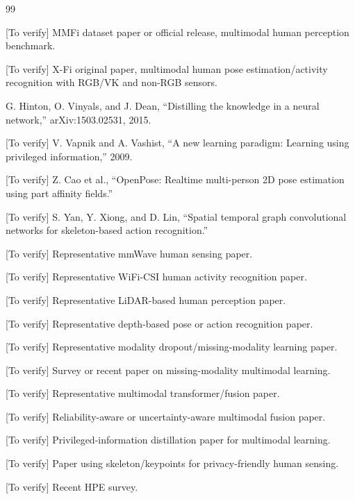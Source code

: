 \documentclass[journal]{IEEEtran}
\begin{document}
\begin{thebibliography}{99}

[To verify] MMFi dataset paper or official release, multimodal human perception benchmark.

[To verify] X-Fi original paper, multimodal human pose estimation/activity recognition with RGB/VK and non-RGB sensors.

G. Hinton, O. Vinyals, and J. Dean, ``Distilling the knowledge in a neural network,'' arXiv:1503.02531, 2015.

[To verify] V. Vapnik and A. Vashist, ``A new learning paradigm: Learning using privileged information,'' 2009.

[To verify] Z. Cao et al., ``OpenPose: Realtime multi-person 2D pose estimation using part affinity fields.''

[To verify] S. Yan, Y. Xiong, and D. Lin, ``Spatial temporal graph convolutional networks for skeleton-based action recognition.''

[To verify] Representative mmWave human sensing paper.

[To verify] Representative WiFi-CSI human activity recognition paper.

[To verify] Representative LiDAR-based human perception paper.

[To verify] Representative depth-based pose or action recognition paper.

[To verify] Representative modality dropout/missing-modality learning paper.

[To verify] Survey or recent paper on missing-modality multimodal learning.

[To verify] Representative multimodal transformer/fusion paper.

[To verify] Reliability-aware or uncertainty-aware multimodal fusion paper.

[To verify] Privileged-information distillation paper for multimodal learning.

[To verify] Paper using skeleton/keypoints for privacy-friendly human sensing.

[To verify] Recent HPE survey.


\end{thebibliography}
\end{document}

